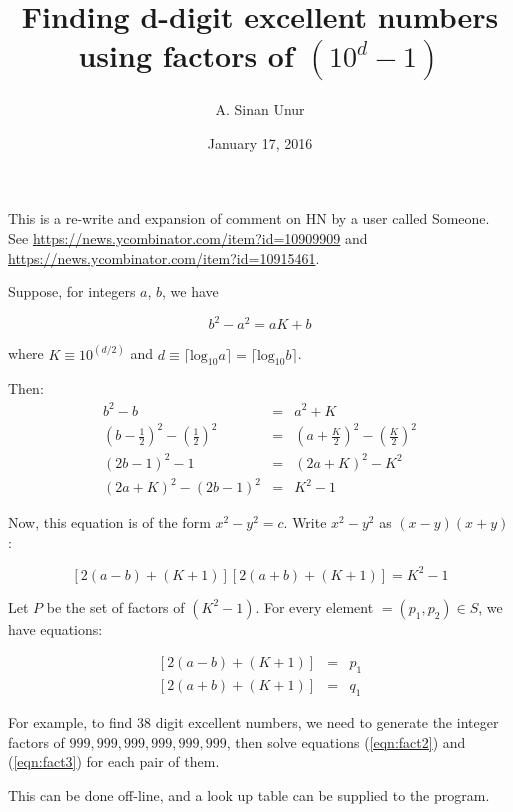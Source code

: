 \documentclass[12pt,letterpaper]{article}
\begin{document}
\title{Finding d-digit excellent numbers using factors of $(10^d - 1)$}

\author{A. Sinan Unur}

\date{January 17, 2016}

\maketitle

This is a re-write and expansion of comment on HN by a user called Someone. See \url{https://news.ycombinator.com/item?id=10909909} and \url{https://news.ycombinator.com/item?id=10915461}.

Suppose, for integers $a$, $b$, we have

\[ b^2 - a^2 = aK + b \]

where $K\equiv 10^(d/2)$ and $d\equiv\lceil\mathrm{log}_{10}a\rceil=\lceil\mathrm{log}_{10}b\rceil$.

Then:
%
\begin{eqnarray}
%
b^2 - b & = & a^2 + K \\
%
(b - \frac{1}{2})^2 - (\frac{1}{2})^2 & = & (a + \frac{K}{2})^2 - (\frac{K}{2})^2 \\
%
(2b - 1)^2 - 1 & = & (2a + K)^2 - K^2 \\
%
(2a + K)^2 - (2b - 1)^2 & = & K^2 - 1
%
\end{eqnarray}

Now, this equation is of the form $x^2 - y^2 = c$. Write $x^2 - y^2$ as $(x - y)(x + y)$:

\begin{equation}
%
\left[2(a - b) + (K + 1)\right] \left[2(a + b) + (K + 1)\right] = K^2 - 1 \label{eqn:fact1}
%
\end{equation}

Let $P$ be the set of factors of $(K^2 - 1)$. For every element $ = (p_1,p_2)\in S$, we have equations:

\begin{eqnarray}
%
\left[2(a - b) + (K + 1)\right] & = & p_1 \label{eqn:fact2}\\
%
\left[2(a + b) + (K + 1)\right] & = & q_1 \label{eqn:fact3}
%
\end{eqnarray}

For example, to find 38 digit excellent numbers, we need to generate the integer factors of $999,999,999,999,999,999$, then solve equations (\ref{eqn:fact2}) and (\ref{eqn:fact3}) for each pair of them.

This can be done off-line, and a look up table can be supplied to the program.
\end{document}
